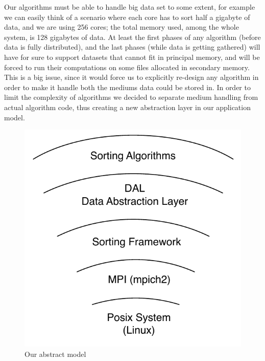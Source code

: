 Our algorithms must be able to handle big data set to some extent, for example we can easily think of a scenario where each core has to sort half a gigabyte of data, and we are using 256 cores; the total memory used, among the whole system, is 128 gigabytes of data.
At least the first phases of any algorithm (before data is fully distributed), and the last phases (while data is getting gathered) will have for sure to support datasets that cannot fit in principal memory, and will be forced to run their computations on some files allocated in secondary memory.
This is a big issue, since it would force us to explicitly re-design any algorithm in order to make it handle both the mediums data could be stored in.
In order to limit the complexity of algorithms we decided to separate medium handling from actual algorithm code, thus creating a new abstraction layer in our application model.

\begin{figure}
  \begin{center}
    \includegraphics[scale=0.50]{levels}
  \end{center}
  \caption{Our abstract model}
  \label{levels}
\end{figure}

